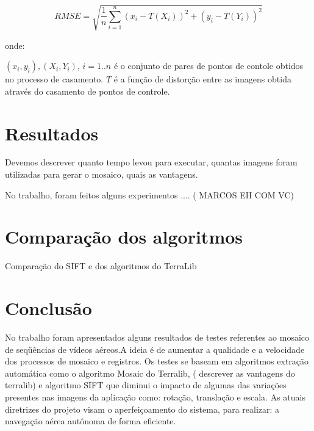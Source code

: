 \documentclass[9pt, a4paper, nofonttune, journal]{IEEEtran}
\begin{document}
$$
	RMSE = \sqrt{\frac{1}{n}\sum\limits_{i=1}^{n}(x_i - T(X_i))^2 + (y_i - T(Y_i))^2}
$$

onde:

$(x_i, y_i), (X_i, Y_i)$, $i = 1..n$ é o conjunto de pares de pontos de contole obtidos no processo de casamento.
$T$ é a função de distorção entre as imagens obtida através do casamento de pontos de controle.


\section{Resultados}
Devemos descrever quanto tempo levou para executar, quantas imagens foram utilizadas para gerar o mosaico, quais as vantagens. 

No trabalho, foram feitos alguns experimentos .... ( MARCOS EH COM VC)


\section{Comparação dos algoritmos}
Comparação do SIFT e dos algoritmos do TerraLib

\section{Conclusão}
No trabalho foram apresentados alguns resultados de testes referentes ao mosaico de seqüências de vídeos aéreos.A ideia é de aumentar a qualidade e a velocidade dos processos de mosaico e registros.
Os testes se baseam em algoritmos extração automática como o algoritmo Mosaic do Terralib, ( descrever as vantagens do terralib) e algoritmo SIFT que diminui o impacto de algumas das variações presentes nas imagens da aplicação como: rotação, translação e escala. 
As atuais diretrizes do projeto visam o aperfeiçoamento do sistema, para realizar: a navegação aérea autônoma de forma eficiente.




\end{document}
